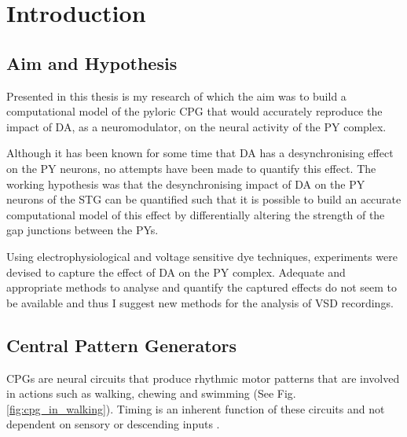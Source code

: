 \acresetall
\chapter{Introduction}
\label{chap:intro}

\section{Aim and Hypothesis}
Presented in this thesis is my research of which the aim was to build a computational model of the pyloric \ac{CPG} that would accurately reproduce the impact of \ac{DA}, as a neuromodulator, on the neural activity of the \ac{PY} complex. 

Although it has been known for some time that \ac{DA} has a desynchronising effect on the \ac{PY} neurons, no attempts have been made to quantify this effect. The working hypothesis was that the desynchronising impact of \ac{DA} on the \ac{PY} neurons of the \ac{STG} can be quantified such that it is possible to build an accurate computational model of this effect by differentially altering the strength of the gap junctions between the \acp{PY}.

Using electrophysiological and voltage sensitive dye techniques, experiments were devised to capture the effect of \ac{DA} on the \ac{PY} complex. Adequate and appropriate methods to analyse and quantify the captured effects do not seem to be available and thus I suggest new methods for the analysis of \ac{VSD} recordings.

\section{Central Pattern Generators}
\Acp{CPG} are neural circuits that produce rhythmic motor patterns that are involved in actions such as walking, chewing and swimming (See Fig. \ref{fig:cpg_in_walking}). Timing is an inherent function of these circuits and not dependent on sensory or descending inputs \cite{Marder2001}.

